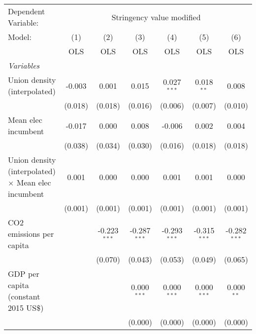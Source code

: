 
\begingroup
\centering
\begin{tabular}{lcccccc}
   \toprule
   Dependent Variable: & \multicolumn{6}{c}{Stringency value modified}\\
   Model:                                                     & (1)     & (2)            & (3)            & (4)            & (5)            & (6)\\  
                                                              &  OLS    & OLS            & OLS            & OLS            & OLS            & OLS\\  
   \midrule
   \emph{Variables}\\
   Union density (interpolated)                               & -0.003  & 0.001          & 0.015          & 0.027$^{***}$  & 0.018$^{**}$   & 0.008\\   
                                                              & (0.018) & (0.018)        & (0.016)        & (0.006)        & (0.007)        & (0.010)\\   
   Mean elec incumbent                                        & -0.017  & 0.000          & 0.008          & -0.006         & 0.002          & 0.004\\   
                                                              & (0.038) & (0.034)        & (0.030)        & (0.016)        & (0.018)        & (0.018)\\   
   Union density (interpolated) $\times$ Mean elec incumbent  & 0.001   & 0.000          & 0.000          & 0.001          & 0.001          & 0.000\\   
                                                              & (0.001) & (0.001)        & (0.001)        & (0.001)        & (0.001)        & (0.001)\\   
   CO2 emissions per capita                                   &         & -0.223$^{***}$ & -0.287$^{***}$ & -0.293$^{***}$ & -0.315$^{***}$ & -0.282$^{***}$\\   
                                                              &         & (0.070)        & (0.043)        & (0.053)        & (0.049)        & (0.065)\\   
   GDP per capita (constant 2015 US\$)                        &         &                & 0.000$^{***}$  & 0.000$^{***}$  & 0.000$^{***}$  & 0.000$^{**}$\\   
                                                              &         &                & (0.000)        & (0.000)        & (0.000)        & (0.000)\\   

\end{tabular}
